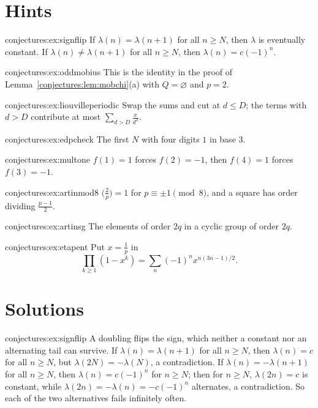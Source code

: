 \section{Hints}

\begin{hint}{conjectures:ex:signflip}
If $\lambda(n)=\lambda(n+1)$ for all $n\ge N$, then $\lambda$ is eventually constant. If $\lambda(n)\ne\lambda(n+1)$ for all $n\ge N$, then $\lambda(n)=c(-1)^n$.
\end{hint}
\begin{hint}{conjectures:ex:oddmobius}
This is the identity in the proof of Lemma~\ref{conjectures:lem:mobchi}(a) with $Q=\varnothing$ and $p=2$.
\end{hint}
\begin{hint}{conjectures:ex:liouvilleperiodic}
Swap the sums and cut at $d\le D$; the terms with $d>D$ contribute at most $\sum_{d>D}\frac x{d^2}$.
\end{hint}
\begin{hint}{conjectures:ex:edpcheck}
The first $N$ with four digits $1$ in base $3$.
\end{hint}
\begin{hint}{conjectures:ex:multone}
$f(1)=1$ forces $f(2)=-1$, then $f(4)=1$ forces $f(3)=-1$.
\end{hint}
\begin{hint}{conjectures:ex:artinmod8}
$\bigl(\frac2p\bigr)=1$ for $p\equiv\pm1\pmod8$, and a square has order dividing $\frac{p-1}2$.
\end{hint}
\begin{hint}{conjectures:ex:artinsg}
The elements of order $2q$ in a cyclic group of order $2q$.
\end{hint}
\begin{hint}{conjectures:ex:etapent}
Put $x=\frac1p$ in
\[
\prod_{k\ge1}(1-x^k)=\sum_n(-1)^nx^{n(3n-1)/2}.
\]
\end{hint}

\section{Solutions}

\begin{solution}{conjectures:ex:signflip}
\idea A doubling flips the sign, which neither a constant nor an alternating tail can survive.
\writeup If $\lambda(n)=\lambda(n+1)$ for all $n\ge N$, then $\lambda(n)=c$ for all $n\ge N$, but $\lambda(2N)=-\lambda(N)$, a contradiction. If
$\lambda(n)=-\lambda(n+1)$ for all $n\ge N$, then $\lambda(n)=c(-1)^n$ for $n\ge N$; then for $n\ge N$, $\lambda(2n)=c$ is constant, while $\lambda(2n)=-\lambda(n)=-c(-1)^n$
alternates, a contradiction. So each of the two alternatives fails infinitely often.
\end{solution}


